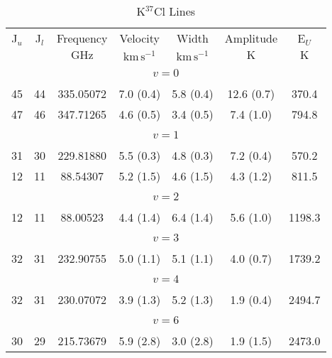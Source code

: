 \begin{table*}[htp]
\centering
\caption{K$^{37}$Cl Lines}
\begin{tabular}{ccccccc}
\label{tab:K37Cl_salt_lines}
 J$_u$ & J$_l$ & Frequency & Velocity & Width & Amplitude & E$_U$ \\
  &  & $\mathrm{GHz}$ & $\mathrm{km\,s^{-1}}$ & $\mathrm{km\,s^{-1}}$ & $\mathrm{K}$ & $\mathrm{K}$ \\
\hline
&\vspace{-0.75em}\\
\multicolumn{7}{c}{$v = 0$} \\
\vspace{-0.75em}\\
 45 & 44 & 335.05072 & 7.0 (0.4) & 5.8 (0.4) & 12.6 (0.7) & 370.4 \\
 47 & 46 & 347.71265 & 4.6 (0.5) & 3.4 (0.5) & 7.4 (1.0) & 794.8 \\
&\vspace{-0.75em}\\
\multicolumn{7}{c}{$v = 1$} \\
\vspace{-0.75em}\\
 31 & 30 & 229.81880 & 5.5 (0.3) & 4.8 (0.3) & 7.2 (0.4) & 570.2 \\
 12 & 11 & 88.54307 & 5.2 (1.5) & 4.6 (1.5) & 4.3 (1.2) & 811.5 \\
&\vspace{-0.75em}\\
\multicolumn{7}{c}{$v = 2$} \\
\vspace{-0.75em}\\
 12 & 11 & 88.00523 & 4.4 (1.4) & 6.4 (1.4) & 5.6 (1.0) & 1198.3 \\
&\vspace{-0.75em}\\
\multicolumn{7}{c}{$v = 3$} \\
\vspace{-0.75em}\\
 32 & 31 & 232.90755 & 5.0 (1.1) & 5.1 (1.1) & 4.0 (0.7) & 1739.2 \\
&\vspace{-0.75em}\\
\multicolumn{7}{c}{$v = 4$} \\
\vspace{-0.75em}\\
 32 & 31 & 230.07072 & 3.9 (1.3) & 5.2 (1.3) & 1.9 (0.4) & 2494.7 \\
\hline
&\vspace{-0.75em}\\
\multicolumn{7}{c}{$v = 6$} \\
\vspace{-0.75em}\\
 30 & 29 & 215.73679 & 5.9 (2.8) & 3.0 (2.8) & 1.9 (1.5) & 2473.0 \\
\end{tabular}

\par 
\end{table*}
